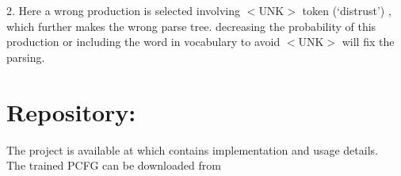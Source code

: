 \documentclass[11pt,a4paper]{article}
\begin{document}
2. Here a wrong production is selected involving $<$UNK$>$ token (`distrust') , which further makes the wrong parse tree. decreasing the probability of this production or including the word in vocabulary to avoid $<$UNK$>$ will fix the parsing.

\section{Repository:}
The project is available at \cite{git} which contains implementation and usage details. \\
The trained PCFG can be downloaded from \cite{link}


\end{document}
